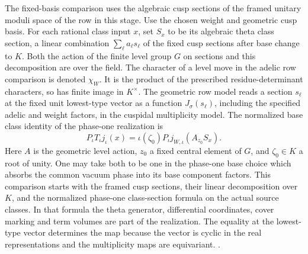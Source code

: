 The fixed-basis comparison uses the algebraic cusp
sections of the framed unitary moduli space of the row
in this stage. Use the chosen weight and geometric cusp
basis. For each rational class input \(x\), set \(S_x\)
to be its algebraic theta class section, a linear combination
\(\sum_\ell a_\ell s_\ell\) of the fixed cusp sections
after base change to \(K\). Both the action of the finite
level group \(G\) on sections and this decomposition are
over the field. The character of a level move in the
adelic row comparison is denoted \(\chi_W\). It is the
product of the prescribed residue-determinant characters,
so has finite image in \(K^\times\).
The geometric row model reads a section \(s_\ell\) at the
fixed unit lowest-type vector as a function \(J_\sigma(s_\ell)\),
including the specified adelic and weight factors, in the
cuspidal multiplicity model. The normalized base class
identity of the phase-one realization is
\begin{equation}
\label{eq:stage-base-phase-one}
 P_\iota T_\iota j_\iota(x)
   =\iota(\zeta_0)P_\iota j_{W,\iota}(A_{z_0}S_x).
\end{equation}
Here \(A\) is the geometric level action, \(z_0\) a fixed
central element of \(G\), and \(\zeta_0\in K\) a root of
unity. One may take both to be one in the phase-one base
choice which absorbs the common vacuum phase into its base
component factors. This comparison starts with the framed cusp sections, their
linear decomposition over \(K\), and the normalized phase-one
class-section formula on the actual source classes. In that
formula the theta generator, differential coordinates, cover
marking and term volumes are part of the realization. The equality at
the lowest-type vector determines the map because the
vector is cyclic in the real representations and the
multiplicity maps are equivariant.
.

